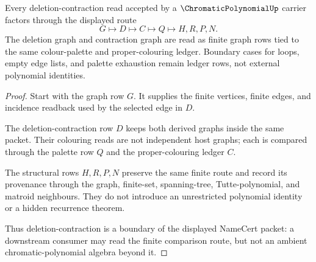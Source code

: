 \begin{theorem}
\label{thm:chromatic-polynomial-deletion-contraction-boundary}
Every deletion-contraction read accepted by a $\ChromaticPolynomialUp$ carrier factors through the displayed route
$$
G \longmapsto D \longmapsto C \longmapsto Q \longmapsto H,R,P,N .
$$
The deletion graph and contraction graph are read as finite graph rows tied to the same colour-palette and proper-colouring ledger. Boundary cases for loops, empty edge lists, and palette exhaustion remain ledger rows, not external polynomial identities.
\end{theorem}
\begin{proof}
Start with the graph row $G$. It supplies the finite vertices, finite edges, and incidence readback used by the selected edge in $D$.

The deletion-contraction row $D$ keeps both derived graphs inside the same packet. Their colouring reads are not independent host graphs; each is compared through the palette row $Q$ and the proper-colouring ledger $C$.

The structural rows $H,R,P,N$ preserve the same finite route and record its provenance through the graph, finite-set, spanning-tree, Tutte-polynomial, and matroid neighbours. They do not introduce an unrestricted polynomial identity or a hidden recurrence theorem.

Thus deletion-contraction is a boundary of the displayed NameCert packet: a downstream consumer may read the finite comparison route, but not an ambient chromatic-polynomial algebra beyond it.
\end{proof}




